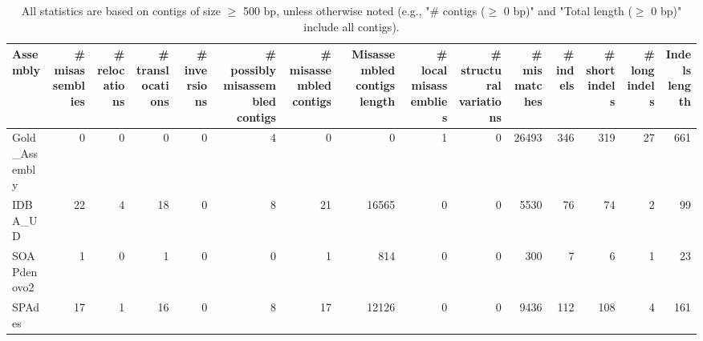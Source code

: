 \documentclass[12pt,a4paper]{article}
\begin{document}
\begin{table}[ht]
\begin{center}
\caption{All statistics are based on contigs of size $\geq$ 500 bp, unless otherwise noted (e.g., "\# contigs ($\geq$ 0 bp)" and "Total length ($\geq$ 0 bp)" include all contigs).}
\begin{tabular}{|l*{14}{|r}|}
\hline
Assembly & \# misassemblies &     \# relocations &     \# translocations &     \# inversions & \# possibly misassembled contigs & \# misassembled contigs & Misassembled contigs length & \# local misassemblies & \# structural variations & \# mismatches & \# indels &     \# short indels &     \# long indels & Indels length \\ \hline
Gold\_Assembly & 0 & 0 & 0 & 0 & 4 & 0 & 0 & 1 & 0 & 26493 & 346 & 319 & 27 & 661 \\ \hline
IDBA\_UD & 22 & 4 & 18 & 0 & 8 & 21 & 16565 & 0 & 0 & 5530 & 76 & 74 & 2 & 99 \\ \hline
SOAPdenovo2 & 1 & 0 & 1 & 0 & 0 & 1 & 814 & 0 & 0 & 300 & 7 & 6 & 1 & 23 \\ \hline
SPAdes & 17 & 1 & 16 & 0 & 8 & 17 & 12126 & 0 & 0 & 9436 & 112 & 108 & 4 & 161 \\ \hline
\end{tabular}
\end{center}
\end{table}
\end{document}
